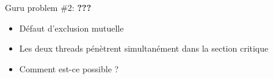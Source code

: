 \documentclass[xcolor={x11names,svgnames}]{beamer}
\begin{document}

\begin{frame}[label=peterson_report2, fragile]

  \begin{block}{Guru problem \#2: \bfseries ???}
    \begin{itemize}
    \item Défaut d'exclusion mutuelle
    \item Les deux threads pénètrent simultanément dans la section critique
    \item Comment est-ce possible ?
    \end{itemize}
  \end{block}
\end{frame}

\end{document}
